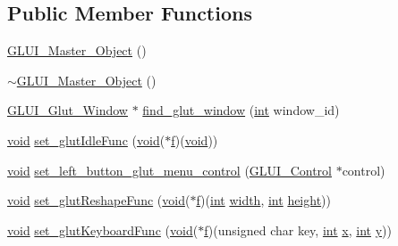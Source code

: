 \subsection*{Public Member Functions}
\begin{DoxyCompactItemize}
\item 
\hyperlink{class_g_l_u_i___master___object_a5947a4fbf4c2d75296781c642cd56d13}{G\+L\+U\+I\+\_\+\+Master\+\_\+\+Object} ()
\item 
\hyperlink{class_g_l_u_i___master___object_a21dd14b088510fb6b3fb1f4d50e31cfc}{$\sim$\+G\+L\+U\+I\+\_\+\+Master\+\_\+\+Object} ()
\item 
\hyperlink{class_g_l_u_i___glut___window}{G\+L\+U\+I\+\_\+\+Glut\+\_\+\+Window} $\ast$ \hyperlink{class_g_l_u_i___master___object_a8f9134da7b46e4147fc07dbf8c881e90}{find\+\_\+glut\+\_\+window} (\hyperlink{wglext_8h_a500a82aecba06f4550f6849b8099ca21}{int} window\+\_\+id)
\item 
\hyperlink{wglext_8h_a9e6b7f1933461ef318bb000d6bd13b83}{void} \hyperlink{class_g_l_u_i___master___object_a5d1b3a7cc294314dda9864cd7bd64a62}{set\+\_\+glut\+Idle\+Func} (\hyperlink{wglext_8h_a9e6b7f1933461ef318bb000d6bd13b83}{void}($\ast$\hyperlink{glext_8h_a691492ec0bd6383f91200e49f6ae40ed}{f})(\hyperlink{wglext_8h_a9e6b7f1933461ef318bb000d6bd13b83}{void}))
\item 
\hyperlink{wglext_8h_a9e6b7f1933461ef318bb000d6bd13b83}{void} \hyperlink{class_g_l_u_i___master___object_afb8aea4fc250cddb252570508acbd603}{set\+\_\+left\+\_\+button\+\_\+glut\+\_\+menu\+\_\+control} (\hyperlink{class_g_l_u_i___control}{G\+L\+U\+I\+\_\+\+Control} $\ast$control)
\item 
\hyperlink{wglext_8h_a9e6b7f1933461ef318bb000d6bd13b83}{void} \hyperlink{class_g_l_u_i___master___object_aed8155ef565e847af72ba26478daa388}{set\+\_\+glut\+Reshape\+Func} (\hyperlink{wglext_8h_a9e6b7f1933461ef318bb000d6bd13b83}{void}($\ast$\hyperlink{glext_8h_a691492ec0bd6383f91200e49f6ae40ed}{f})(\hyperlink{wglext_8h_a500a82aecba06f4550f6849b8099ca21}{int} \hyperlink{glext_8h_aa105b18f96e6bc2485cb7f576a7fb9ba}{width}, \hyperlink{wglext_8h_a500a82aecba06f4550f6849b8099ca21}{int} \hyperlink{glext_8h_aa214bd63e12f7ddf524c83894fcc69a7}{height}))
\item 
\hyperlink{wglext_8h_a9e6b7f1933461ef318bb000d6bd13b83}{void} \hyperlink{class_g_l_u_i___master___object_aec70f38a81424a09c42f5a3e4e6edc43}{set\+\_\+glut\+Keyboard\+Func} (\hyperlink{wglext_8h_a9e6b7f1933461ef318bb000d6bd13b83}{void}($\ast$\hyperlink{glext_8h_a691492ec0bd6383f91200e49f6ae40ed}{f})(unsigned char key, \hyperlink{wglext_8h_a500a82aecba06f4550f6849b8099ca21}{int} \hyperlink{glext_8h_ad77deca22f617d3f0e0eb786445689fc}{x}, \hyperlink{wglext_8h_a500a82aecba06f4550f6849b8099ca21}{int} \hyperlink{glext_8h_a9298c7ad619074f5285b32c6b72bfdea}{y}))

\end{DoxyCompactItemize}
